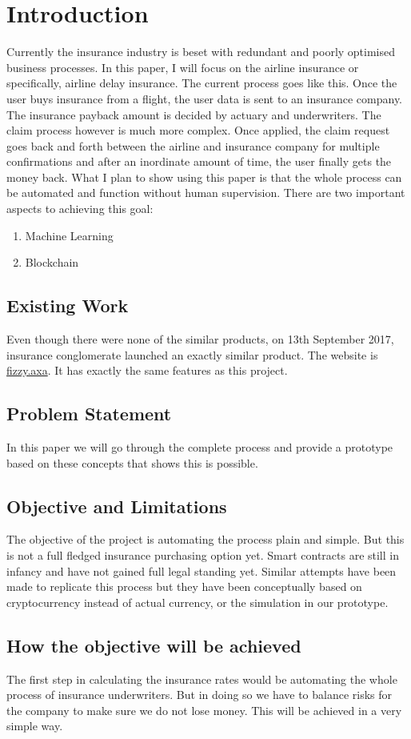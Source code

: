 \chapter{Introduction}

Currently the insurance industry is beset with redundant and poorly optimised business processes. In this paper, I will focus on the airline insurance or specifically, airline delay insurance. The current process goes like this. Once the user buys insurance from a flight, the user data is sent to an insurance company. The insurance payback amount is decided by actuary and underwriters. The claim process however is much more complex. Once applied, the claim request goes back and forth between the airline and insurance company for multiple confirmations and after an inordinate amount of time, the user finally gets the money back. What I plan to show using this paper is that the whole process can be automated and function without human supervision. There are two important aspects to achieving this goal:
\begin{enumerate}
    \item Machine Learning
    \item Blockchain
\end{enumerate}

\section{Existing Work}
Even though there were none of the similar products, on 13th September 2017, insurance conglomerate launched an exactly similar product. The website is \url{fizzy.axa}. It has exactly the same features as this project. 
\section{Problem Statement}
In this paper we will go through the complete process and provide a prototype based on these concepts that shows this is possible.

\section{Objective and Limitations}
The objective of the project is automating the process plain and simple. But this is not a full fledged insurance purchasing option yet. Smart contracts are still in infancy and have not gained full legal standing yet. Similar attempts have been made to replicate this process but they have been conceptually based on cryptocurrency instead of actual currency, or the simulation in our prototype.

\section{How the objective will be achieved}
The first step in calculating the insurance rates would be automating the whole process of insurance underwriters. But in doing so we have to balance risks for the company to make sure we do not lose money. This will be achieved in a very simple way. 
